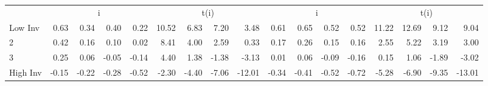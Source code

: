 \begin{table}[!ht]
\begin{tabular}{lrrrrrrrrrrrrrrrr}
  
     & \multicolumn{4}{c}{i} & \multicolumn{4}{c}{t(i)}  & \multicolumn{4}{c}{i} & \multicolumn{4}{c}{t(i)}   \\
     \cmidrule(r){2-5} \cmidrule(r){6-9}  \cmidrule(r){10-13} \cmidrule(r){14-17} 
    Low Inv  & 0.63  & 0.34  & 0.40  & 0.22  & 10.52  & 6.83  & 7.20  & 3.48  & 0.61  & 0.65  & 0.52  & 0.52  & 11.22  & 12.69  & 9.12  & 9.04   \\
    2  & 0.42  & 0.16  & 0.10  & 0.02  & 8.41  & 4.00  & 2.59  & 0.33  & 0.17  & 0.26  & 0.15  & 0.16  & 2.55  & 5.22  & 3.19  & 3.00   \\
    3  & 0.25  & 0.06  & -0.05  & -0.14  & 4.40  & 1.38  & -1.38  & -3.13  & 0.01  & 0.06  & -0.09  & -0.16  & 0.15  & 1.06  & -1.89  & -3.02   \\
    High Inv  & -0.15  & -0.22  & -0.28  & -0.52  & -2.30  & -4.40  & -7.06  & -12.01  & -0.34  & -0.41  & -0.52  & -0.72  & -5.28  & -6.90  & -9.35  & -13.01   \\
    
  
  \bottomrule
\end{tabular}
\label{tbl:32_Size_OP_Inv_F16}
\end{table}